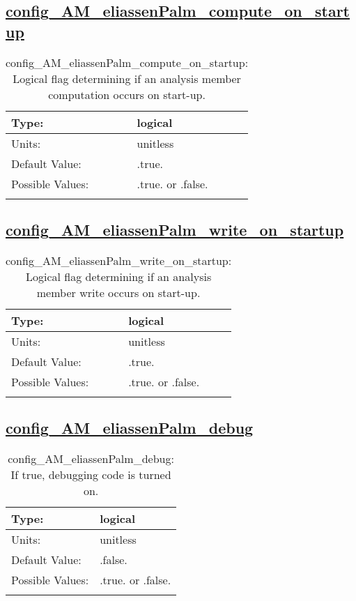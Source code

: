 \subsection[config\_AM\_eliassenPalm\_compute\_on\_startup]{\hyperref[sec:nm_tab_AM_eliassenPalm]{config\_AM\_eliassenPalm\_compute\_on\_startup}}
\label{subsec:nm_sec_config_AM_eliassenPalm_compute_on_startup}
\begin{center}
\begin{longtable}{| p{2.0in} || p{4.0in} |}
    \hline
    Type: & logical \\
    \hline
    Units: & \si{unitless} \\
    \hline
    Default Value: & .true. \\
    \hline
    Possible Values: & .true. or .false. \\
    \hline
    \caption{config\_AM\_eliassenPalm\_compute\_on\_startup: Logical flag determining if an analysis member computation occurs on start-up.}
\end{longtable}
\end{center}
\subsection[config\_AM\_eliassenPalm\_write\_on\_startup]{\hyperref[sec:nm_tab_AM_eliassenPalm]{config\_AM\_eliassenPalm\_write\_on\_startup}}
\label{subsec:nm_sec_config_AM_eliassenPalm_write_on_startup}
\begin{center}
\begin{longtable}{| p{2.0in} || p{4.0in} |}
    \hline
    Type: & logical \\
    \hline
    Units: & \si{unitless} \\
    \hline
    Default Value: & .true. \\
    \hline
    Possible Values: & .true. or .false. \\
    \hline
    \caption{config\_AM\_eliassenPalm\_write\_on\_startup: Logical flag determining if an analysis member write occurs on start-up.}
\end{longtable}
\end{center}
\subsection[config\_AM\_eliassenPalm\_debug]{\hyperref[sec:nm_tab_AM_eliassenPalm]{config\_AM\_eliassenPalm\_debug}}
\label{subsec:nm_sec_config_AM_eliassenPalm_debug}
\begin{center}
\begin{longtable}{| p{2.0in} || p{4.0in} |}
    \hline
    Type: & logical \\
    \hline
    Units: & \si{unitless} \\
    \hline
    Default Value: & .false. \\
    \hline
    Possible Values: & .true. or .false. \\
    \hline
    \caption{config\_AM\_eliassenPalm\_debug: If true, debugging code is turned on.}
\end{longtable}
\end{center}
